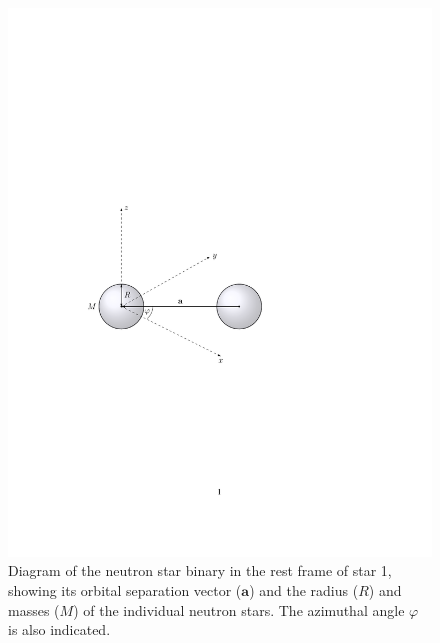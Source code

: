 \documentclass[11pt]{article}
\begin{document}
\begin{figure}[!h]
\begin{mdframed}
\centering
\includegraphics{relativistic_orbit/binary_diagram.pdf}
\caption{\label{fig:binary_diagram}Diagram of the neutron star binary in the rest frame of star 1, showing its orbital separation vector ($\mathbf{a}$) and the radius ($R$) and masses ($M$) of the individual neutron stars. The azimuthal angle $\varphi$ is also indicated.}
\end{mdframed}
\end{figure}

\vspace{1000pt}
\end{document}
